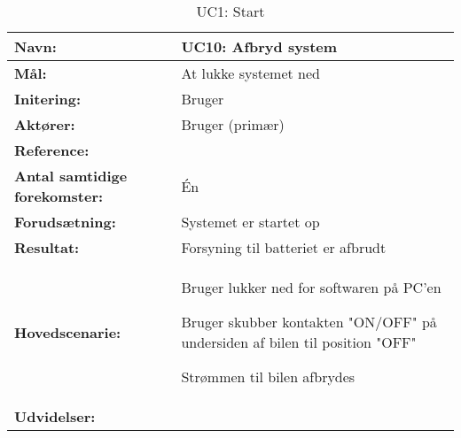 \begin{table}[h]
\begin{tabularx}{\textwidth}{| >{\raggedright\arraybackslash}p{3.3 cm} | >{\raggedright\arraybackslash}X |} \hline

\textbf{Navn:} 						& UC10: Afbryd system\\ \hline
\textbf{Mål:}						& At lukke systemet ned \\ \hline
\textbf{Initering:}					& Bruger \\ \hline
\textbf{Aktører:} 					& Bruger (primær) \\ \hline
\textbf{Reference:} 				&  \\ \hline
\textbf{Antal samtidige forekomster:} & Én \\ \hline
\textbf{Forudsætning:} 				& Systemet er startet op\\ \hline
\textbf{Resultat:}					& Forsyning til batteriet er afbrudt \\ \hline
\textbf{Hovedscenarie:}				& 

\begin{packed_enum}
\item Bruger lukker ned for softwaren på PC'en
\item Bruger skubber kontakten "ON/OFF" på undersiden af bilen til position "OFF"
\item Strømmen til bilen afbrydes 
\end{packed_enum} \\ \hline
\textbf{Udvidelser:}				&  
\textbf{}
\\ \hline
\end{tabularx}
\caption{UC1: Start}
\label{tbl:UC1}
\end{table}
